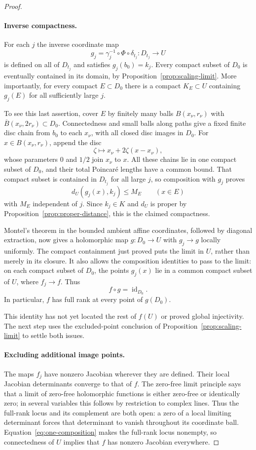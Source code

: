 \begin{proof}
\paragraph{Inverse compactness.}
For each $j$ the inverse coordinate map
\[
 g_j=\gamma_j^{-1}\circ\Phi\circ\delta_{t_j}:D_{t_j}\longrightarrow U
\]
is defined on all of $D_{t_j}$ and satisfies $g_j(b_0)=k_j$.  Every compact
subset of $D_0$ is eventually contained in its domain, by
Proposition~\ref{prop:scaling-limit}.  More importantly, for every compact
$E\subset D_0$ there is a compact $K_E\subset U$ containing $g_j(E)$
for all sufficiently large $j$.

To see this last assertion, cover $E$ by finitely many balls
$B(x_\nu,r_\nu)$ with $\overline B(x_\nu,2r_\nu)\subset D_0$.
Connectedness and small balls along paths give a fixed finite disc chain
from $b_0$ to each $x_\nu$, with all closed disc images in $D_0$.
For $x\in B(x_\nu,r_\nu)$, append the disc
\[
 \zeta\longmapsto x_\nu+2\zeta(x-x_\nu),
\]
whose parameters $0$ and $1/2$ join $x_\nu$ to $x$.  All these chains
lie in one compact subset of $D_0$, and their total Poincar\'e lengths
have a common bound.  That compact subset is contained in $D_{t_j}$
for all large $j$, so composition with $g_j$ proves
\[
 d_U(g_j(x),k_j)\le M_E\qquad(x\in E)
\]
with $M_E$ independent of $j$.  Since $k_j\in K$ and $d_U$ is proper by
Proposition~\ref{prop:proper-distance}, this is the claimed compactness.

Montel's theorem in the bounded ambient affine coordinates, followed by
diagonal extraction, now gives a holomorphic map $g:D_0\to U$ with
$g_j\to g$ locally uniformly.  The compact containment just proved puts
the limit in $U$, rather than merely in its closure.  It also allows the
composition identities to pass to the limit: on each compact subset of
$D_0$, the points $g_j(x)$ lie in a common compact subset of $U$, where
$f_j\to f$.  Thus
\begin{equation}
\label{eq:one-composition}
 f\circ g=\operatorname{id}_{D_0}.
\end{equation}
In particular, $f$ has full rank at every point of $g(D_0)$.

This identity has not yet located the rest of $f(U)$ or proved global
injectivity. The next step uses the excluded-point conclusion of
Proposition~\ref{prop:scaling-limit} to settle both issues.

\paragraph{Excluding additional image points.}
The maps $f_j$ have nonzero Jacobian wherever they are defined.  Their
local Jacobian determinants converge to that of $f$.  The zero-free
limit principle says that a limit of zero-free holomorphic functions is
either zero-free or identically zero; in several variables this follows
by restriction to complex lines.  Thus the full-rank locus and its
complement are both open: a zero of a local limiting determinant forces
that determinant to vanish throughout its coordinate ball.
Equation~\eqref{eq:one-composition} makes the full-rank locus nonempty,
so connectedness of $U$ implies that $f$ has nonzero Jacobian everywhere.


\end{proof}
